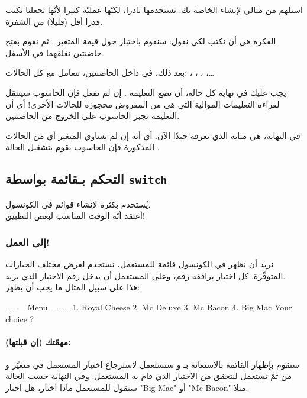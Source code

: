 استلهم من مثالي لإنشاء
الخاصة بك. نستخدمها نادرا، لكنّها عمليّة كثيرا لأنّها تجعلنا نكتب قدرا أقل (قليلا) من الشفرة.

الفكرة هي أن نكتب 
 لكي نقول: سنقوم باختبار حول قيمة المتغير
.
ثم نقوم بفتح حاضنتين نغلقهما في الأسفل.

بعد ذلك، في داخل الحاضنتين، تتعامل مع كل الحالات:
، ، ، ،\dots

يجب عليك في نهاية كل حالة، أن تضع التعليمة 
.
إن لم تفعل فإن الحاسوب سينتقل لقراءة التعليمات الموالية التي هي  من المفروض محجوزة للحالات الأخرى! أي أن التعليمة 
تجبر الحاسوب على الخروج من الحاضنتين.

في النهاية،
هي مثابة 
الذي تعرفه جيدًا الآن. أي أنه إن لم يساوي المتغير أي من الحالات المذكورة فإن الحاسوب يقوم بتشغيل الحالة
.

\subsection{التحكم بـقائمة بواسطة \texttt{switch}}

يُستخدم بكثرة لإنشاء قوائم في الكونسول.\\
أعتقد أنّه الوقت المناسب لبعض التطبيق!

\subsubsection{إلى العمل!}

نريد أن نظهر في الكونسول قائمة للمستعمل، نستخدم
لعرض مختلف الخيارات المتوفّرة. كل اختيار يرافقه رقم، وعلى المستعمل أن يدخل رقم الاختيار الذي يريد.\\
هذا على سبيل المثال ما يجب أن يظهر:

\begin{Console}
=== Menu ===
1. Royal Cheese
2. Mc Deluxe
3. Mc Bacon
4. Big Mac
Your choice ?
\end{Console}

\paragraph{مهمّتك (إن قبلتها):}
ستقوم بإظهار القائمة بالاستعانة بـ 
و ستستعمل 
لاسترجاع اختيار المستعمل  في متغيّر
و من ثمّ تستعمل
لنتحقق من الاختيار الذي قام به المستعمل. وفي النهاية حسب الحالة ستقول للمستعمل ماذا اختار، هل اختار
"\textenglish{Big Mac}"
أو
"\textenglish{Mc Bacon}"
مثلا.

